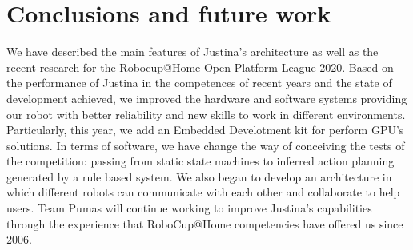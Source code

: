 \documentclass{llncs}
\begin{document}
\section{Conclusions and future work}\label{sec:conclusions}
We have described the main features of Justina's architecture as well as the recent research for the Robocup@Home Open Platform League 2020. Based on the performance of Justina in the competences of recent years and the state of development achieved, we improved the hardware and software systems providing our robot with better reliability and new skills to work in different environments. 
Particularly, this year, we add an Embedded Develotment kit \cite{jetson} for perform GPU's solutions.
In terms of software, we have change the way of conceiving the tests of the competition: passing from static state machines to inferred action planning generated by a rule based system.
We also began to develop an architecture in which different robots can communicate with each other and collaborate to help users.
Team Pumas will continue working to improve Justina's capabilities through the experience that RoboCup@Home competencies have offered us since 2006.




\end{document}
